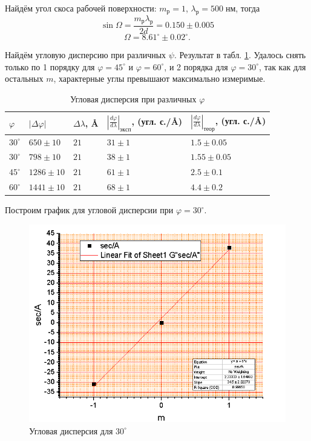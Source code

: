 \documentclass[a4paper]{article}
\begin{document}
Найдём угол скоса рабочей поверхности: $ m_р = 1 $, $ \lambda_р = 500 \; нм $, тогда
\begin{equation*}\label{key}
	\sin \Omega = \frac{m_р \lambda_р}{2 d} = 0.150\pm 0.005
\end{equation*}
\begin{equation*}\label{key}
	\Omega = 8.61^\circ \pm 0.02^\circ.
\end{equation*}

Найдём угловую дисперсию при различных $ \psi $. Результат в табл. \ref{tab:dispersion}. Удалось снять только по 1 порядку для $\varphi = 45^\circ$ и $ \varphi = 60^\circ $, и 2 порядка для $ \varphi = 30^\circ $, так как для остальных $ m $, характерные углы превышают максимально измеримые.



\begin{table}[]
	\centering
	\begin{tabular}{|l|l|l|l|l|}
		\hline
		$\varphi$ &
		$\left|\Delta \varphi\right|$ &
		$\Delta \lambda$, \AA{} &
		$\left|\frac{d \varphi}{d \lambda}\right|_{эксп}$, (угл. с./\AA{}) &
		$\left|\frac{d \varphi}{d \lambda}\right|_{теор}$, (угл. с./\AA{}) \\ \hline
		$30^\circ$ & $650\pm 10$  & $21$ & $31\pm 1$ & $1.5\pm 0.05$ \\ \hline
		$30^\circ$ & $798\pm 10$  & $21$ & $38\pm 1$ & $1.55\pm 0.05$ \\ \hline
		$45^\circ$ & $1286\pm 10$ & $21$ & $61\pm 1$ & $2.5\pm 0.1$     \\ \hline
		$60^\circ$ & $1441\pm 10$ & $21$ & $68\pm 1$ & $4.4\pm 0.2$     \\ \hline
	\end{tabular}
	\caption{Угловая дисперсия при различных $ \varphi $}
	\label{tab:dispersion}
\end{table}

Построим график для угловой дисперсии при $ \varphi = 30^\circ $.

\begin{figure}[tbp]
	\centering
	\includegraphics[width=0.8\linewidth]{Screenshot_3}
	\caption{Угловая дисперсия для $30^\circ$}
	\label{fig:screenshot3}
\end{figure}
\end{document}
